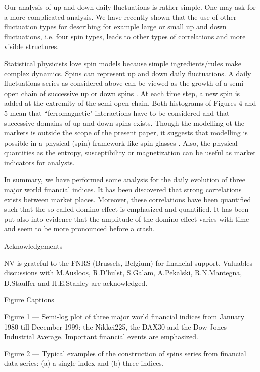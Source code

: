 \documentclass[12pt]{article}
\begin{document}
Our analysis of up and down daily fluctuations is rather simple. One may ask for a more complicated analysis. We have recently shown \cite{zipfabud} that the use of other fluctuation types for describing for example large or small up and down fluctuations, i.e. four spin types, leads to other types of correlations and more visible structures. 

Statistical physicists love spin models because simple ingredients/rules make complex dynamics. Spins can represent up and down daily fluctuations. A daily fluctuations series as considered above can be viewed as the growth of a semi-open chain of successive up or down spins \cite{mem}. At each time step, a new spin is added at the extremity of the semi-open chain. Both histograms of Figures 4 and 5 mean that ``ferromagnetic" interactions have to be considered and that successive domains of up and down spins exists. Though the modelling ot the markets is outside the scope of the present paper, it suggests that modelling is possible in a physical (spin) framework like spin glasses \cite{mezard87}. Also, the physical quantities as the entropy, susceptibility or magnetization can be useful as market indicators for analysts.

In summary, we have performed some analysis for the daily evolution of three major world financial indices. It has been discovered that strong correlations exists between market places. Moreover, these correlations have been quantified such that the so-called domino effect is emphasized and quantified. It has been put also into evidence that the amplitude of the domino effect varies with time and seem to be more pronounced before a crash. 


\vskip 1.0cm
{\noindent \large Acknowledgements}
\vskip 0.6cm

NV is grateful to the FNRS (Brussels, Belgium) for financial support. Valuables discussions with M.Ausloos, R.D'hulst, S.Galam, A.Pekalski, R.N.Mantegna, D.Stauffer and H.E.Stanley are acknowledged.


\newpage
{\noindent \large Figure Captions}
\vskip 0.6cm

Figure 1 --- Semi-log plot of three major world financial indices from January 1980 till December 1999: the Nikkei225, the DAX30 and the Dow Jones Industrial Average. Important financial events are emphasized.

\vskip 1.0cm
Figure 2 --- Typical examples of the construction of spins series from financial data series: (a) a single index and (b) three indices. 
\end{document}
